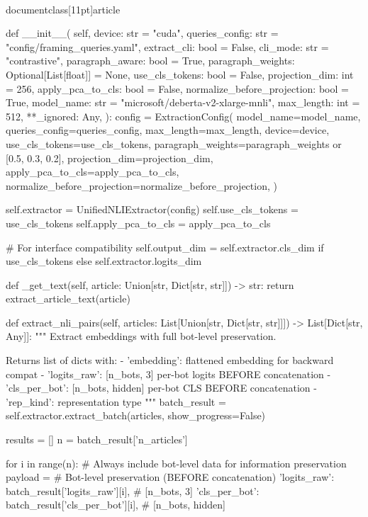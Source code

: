 \\documentclass[11pt]{article}
\begin{document}
\begin{CodeBlock}
    def __init__(
        self,
        device: str = "cuda",
        queries_config: str = "config/framing_queries.yaml",
        extract_cli: bool = False,
        cli_mode: str = "contrastive",
        paragraph_aware: bool = True,
        paragraph_weights: Optional[List[float]] = None,
        use_cls_tokens: bool = False,
        projection_dim: int = 256,
        apply_pca_to_cls: bool = False,
        normalize_before_projection: bool = True,
        model_name: str = "microsoft/deberta-v2-xlarge-mnli",
        max_length: int = 512,
        **_ignored: Any,
    ):
        config = ExtractionConfig(
            model_name=model_name,
            queries_config=queries_config,
            max_length=max_length,
            device=device,
            use_cls_tokens=use_cls_tokens,
            paragraph_weights=paragraph_weights or [0.5, 0.3, 0.2],
            projection_dim=projection_dim,
            apply_pca_to_cls=apply_pca_to_cls,
            normalize_before_projection=normalize_before_projection,
        )
        
        self.extractor = UnifiedNLIExtractor(config)
        self.use_cls_tokens = use_cls_tokens
        self.apply_pca_to_cls = apply_pca_to_cls
        
        # For interface compatibility
        self.output_dim = self.extractor.cls_dim if use_cls_tokens else self.extractor.logits_dim
    
    def _get_text(self, article: Union[str, Dict[str, str]]) -> str:
        return extract_article_text(article)
    
    def extract_nli_pairs(self, articles: List[Union[str, Dict[str, str]]]) -> List[Dict[str, Any]]:
        """
        Extract embeddings with full bot-level preservation.

        Returns list of dicts with:
        - 'embedding': flattened embedding for backward compat
        - 'logits_raw': [n_bots, 3] per-bot logits BEFORE concatenation
        - 'cls_per_bot': [n_bots, hidden] per-bot CLS BEFORE concatenation
        - 'rep_kind': representation type
        """
        batch_result = self.extractor.extract_batch(articles, show_progress=False)

        results = []
        n = batch_result['n_articles']

        for i in range(n):
            # Always include bot-level data for information preservation
            payload = {
                # Bot-level preservation (BEFORE concatenation)
                'logits_raw': batch_result['logits_raw'][i],      # [n_bots, 3]
                'cls_per_bot': batch_result['cls_per_bot'][i],    # [n_bots, hidden]
            }


\end{CodeBlock}
\end{document}
